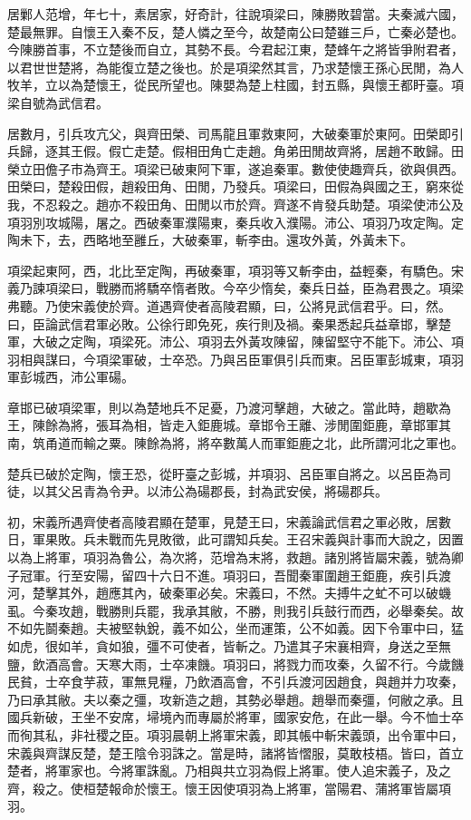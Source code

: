 居鄛人范增，年七十，素居家，好奇計，往說項梁曰，陳勝敗碧當。夫秦滅六國，楚最無罪。自懷王入秦不反，楚人憐之至今，故楚南公曰楚雖三戶，亡秦必楚也。今陳勝首事，不立楚後而自立，其勢不長。今君起江東，楚蜂午之將皆爭附君者，以君世世楚將，為能復立楚之後也。於是項梁然其言，乃求楚懷王孫心民閒，為人牧羊，立以為楚懷王，從民所望也。陳嬰為楚上柱國，封五縣，與懷王都盱臺。項梁自號為武信君。

居數月，引兵攻亢父，與齊田榮、司馬龍且軍救東阿，大破秦軍於東阿。田榮即引兵歸，逐其王假。假亡走楚。假相田角亡走趙。角弟田閒故齊將，居趙不敢歸。田榮立田儋子市為齊王。項梁已破東阿下軍，遂追秦軍。數使使趣齊兵，欲與俱西。田榮曰，楚殺田假，趙殺田角、田閒，乃發兵。項梁曰，田假為與國之王，窮來從我，不忍殺之。趙亦不殺田角、田閒以市於齊。齊遂不肯發兵助楚。項梁使沛公及項羽別攻城陽，屠之。西破秦軍濮陽東，秦兵收入濮陽。沛公、項羽乃攻定陶。定陶未下，去，西略地至雝丘，大破秦軍，斬李由。還攻外黃，外黃未下。

項梁起東阿，西，北比至定陶，再破秦軍，項羽等又斬李由，益輕秦，有驕色。宋義乃諫項梁曰，戰勝而將驕卒惰者敗。今卒少惰矣，秦兵日益，臣為君畏之。項梁弗聽。乃使宋義使於齊。道遇齊使者高陵君顯，曰，公將見武信君乎。曰，然。曰，臣論武信君軍必敗。公徐行即免死，疾行則及禍。秦果悉起兵益章邯，擊楚軍，大破之定陶，項梁死。沛公、項羽去外黃攻陳留，陳留堅守不能下。沛公、項羽相與謀曰，今項梁軍破，士卒恐。乃與呂臣軍俱引兵而東。呂臣軍彭城東，項羽軍彭城西，沛公軍碭。

章邯已破項梁軍，則以為楚地兵不足憂，乃渡河擊趙，大破之。當此時，趙歇為王，陳餘為將，張耳為相，皆走入鉅鹿城。章邯令王離、涉閒圍鉅鹿，章邯軍其南，筑甬道而輸之粟。陳餘為將，將卒數萬人而軍鉅鹿之北，此所謂河北之軍也。

楚兵已破於定陶，懷王恐，從盱臺之彭城，并項羽、呂臣軍自將之。以呂臣為司徒，以其父呂青為令尹。以沛公為碭郡長，封為武安侯，將碭郡兵。

初，宋義所遇齊使者高陵君顯在楚軍，見楚王曰，宋義論武信君之軍必敗，居數日，軍果敗。兵未戰而先見敗徵，此可謂知兵矣。王召宋義與計事而大說之，因置以為上將軍，項羽為魯公，為次將，范增為末將，救趙。諸別將皆屬宋義，號為卿子冠軍。行至安陽，留四十六日不進。項羽曰，吾聞秦軍圍趙王鉅鹿，疾引兵渡河，楚擊其外，趙應其內，破秦軍必矣。宋義曰，不然。夫搏牛之虻不可以破蟣虱。今秦攻趙，戰勝則兵罷，我承其敝，不勝，則我引兵鼓行而西，必舉秦矣。故不如先鬬秦趙。夫被堅執銳，義不如公，坐而運策，公不如義。因下令軍中曰，猛如虎，很如羊，貪如狼，彊不可使者，皆斬之。乃遣其子宋襄相齊，身送之至無鹽，飲酒高會。天寒大雨，士卒凍饑。項羽曰，將戮力而攻秦，久留不行。今歲饑民貧，士卒食芋菽，軍無見糧，乃飲酒高會，不引兵渡河因趙食，與趙并力攻秦，乃曰承其敝。夫以秦之彊，攻新造之趙，其勢必舉趙。趙舉而秦彊，何敝之承。且國兵新破，王坐不安席，埽境內而專屬於將軍，國家安危，在此一舉。今不恤士卒而徇其私，非社稷之臣。項羽晨朝上將軍宋義，即其帳中斬宋義頭，出令軍中曰，宋義與齊謀反楚，楚王陰令羽誅之。當是時，諸將皆慴服，莫敢枝梧。皆曰，首立楚者，將軍家也。今將軍誅亂。乃相與共立羽為假上將軍。使人追宋義子，及之齊，殺之。使桓楚報命於懷王。懷王因使項羽為上將軍，當陽君、蒲將軍皆屬項羽。


